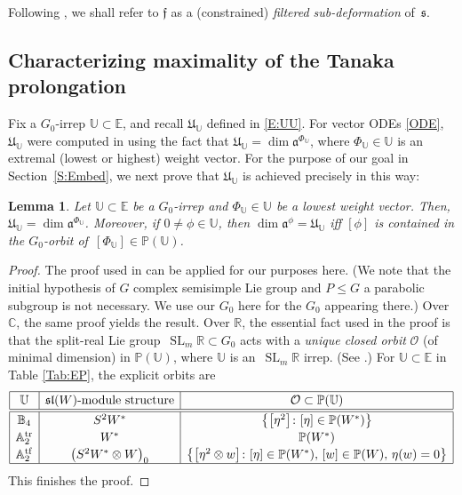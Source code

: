 \documentclass[pdftex]{sigma}%
\newcommand\bbP{\mathbb{P}}
\DeclareMathOperator{\tf}{tf}
\DeclareMathOperator{\tr}{tr}
\newcommand\fa{\mathfrak{a}}
\newcommand\ff{\mathfrak{f}}
\newcommand\fs{\mathfrak{s}}
\newcommand\fsl{\mathfrak{sl}}
\newcommand\fU{\mathfrak{U}}
\newcommand{\R}{\mathbb{R}}
\newcommand{\C}{\mathbb{C}}
\newcommand\bbE{\mathbb{E}}
\newcommand\bbU{\mathbb{U}}
\newcommand\bbA{\mathbb{A}}
\newcommand\bbB{\mathbb{B}}
\newcommand\SL{\operatorname{SL}}
\newcommand\cO{\mathcal{O}}
\numberwithin{equation}{section}
\newtheorem{Lemma}[Theorem]{Lemma}
\begin{document}
Following \cite[Section~2.2]{The2021}, we shall refer to $\ff$ as a (constrained) {\em filtered sub-deformation} of~$\fs$.


\subsection{Characterizing maximality of the Tanaka prolongation}\label{S:BFT}

Fix a $G_0$-irrep $\bbU \subset \bbE$, and recall $\fU_\bbU$ defined in \eqref{E:UU}. For vector ODEs \eqref{ODE}, $\fU_\bbU$ were computed in \cite[Section~3.4]{KT2021} using the fact that $\fU_\bbU = \dim \fa^{\Phi_\bbU}$, where $\Phi_\bbU \in \bbU$ is an extremal (lowest or highest) weight vector. For the purpose of our goal in Section~\ref{S:Embed}, we next prove that $\fU_\bbU$ is achieved precisely in this way:

\begin{Lemma} \label{L: Max}
Let $\bbU \subset \bbE$ be a $G_0$-irrep and $\Phi_\bbU \in \bbU$ be a lowest weight vector. Then, $\fU_\bbU = \dim \fa^{\Phi_\bbU}$. Moreover, if $0 \neq \phi \in \bbU$, then $\dim \fa^\phi = \fU_\bbU$ iff $[\phi]$ is contained in the $G_0$-orbit of~${[\Phi_\bbU] \in \bbP(\bbU)}$.
\end{Lemma}

\begin{proof} The proof used in \cite[Proposition~3.1.1]{KT2017} can be applied for our purposes here. (We note that the initial hypothesis of $G$ complex semisimple Lie group and $P \leq G$ a parabolic subgroup is not necessary. We use our $G_0$ here for the $G_0$ appearing there.) Over $\C$, the same proof yields the result. Over $\R$, the essential fact used in the proof is that the split-real Lie group~$\SL_m\R \subset G_0$ acts with a {\em unique closed orbit} $\cO$ (of minimal dimension) in $\bbP(\bbU)$, where $\bbU$ is an~$\SL_m\R$ irrep. (See \cite[Corollary~1]{Winther2023}.) For $\bbU \subset \bbE$ in Table \ref{Tab:EP}, the explicit orbits are
 \[\renewcommand{\arraystretch}{1.15}
 \begin{array}{|c|c|c|} \hline
 \bbU & \fsl(W)\text{-module structure} & \cO \subset \bbP(\bbU)\\ \hline\hline
 \bbB_4 & S^2 W^* & \bigl\{ \big[\eta^2\big]\colon [\eta] \in \bbP(W^*) \bigr\}\\
 \bbA_2^{\tr} & W^* & \bbP(W^*) \\
 \bbA_2^{\tf} & \bigl(S^2 W^* \otimes W\bigr)_0 & \bigl\{ \big[\eta^2 \otimes w\big]\colon [\eta] \in \bbP(W^*),\, [w] \in \bbP(W),\, \eta(w) = 0 \bigr\}\\\hline
 \end{array}
 \]
This finishes the proof.
\end{proof}
\end{document}
